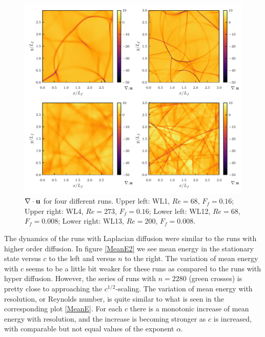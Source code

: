 \documentclass{jfm}
\begin{document}
\begin{figure}
\centerline{\includegraphics[width=6.0in]{../Pyfig/fig_phys_fields_wave_lap}}
\caption{$ \nabla \cdot {\bf u} $ for four different runs. Upper left: WL1, $ Re = 68 $, $ F_f = 0.16 $; Upper right: WL4,  $ Re = 273 $, $ F_f = 0.16 $; Lower left: WL12, $ Re = 68 $, $ F_f = 0.008 $; Lower right: WL13,  $ Re = 200 $, $ F_f = 0.008 $.}
\label{Physical_lap}
\end{figure}




The dynamics of the runs with Laplacian diffusion were similar to the runs with higher order diffusion. In figure \ref{MeanE2} we see mean energy in the stationary state versus $ c $ to the left and versus $ n $ to the right. 
The variation of mean energy with $ c $ seems to be a little bit weaker for these runs as compared to the runs with hyper diffusion. However, the series of runs with $ n = 2280 $ (green crosses) is pretty close to approaching the $ c^{1/2} $-scaling.
The variation of mean energy with resolution, or Reynolds number, is quite similar to what is seen in the corresponding plot \ref{MeanE}. For each $ c $ there is a monotonic increase of mean energy with resolution, and the increase is becoming stronger as $ c $ is increased, with comparable but not equal values of the exponent $ \alpha $.  
\end{document}
